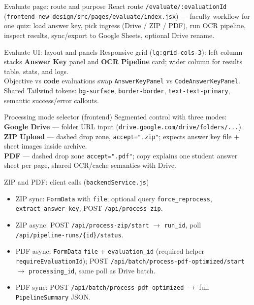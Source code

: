 \documentclass[aspectratio=169]{beamer}
\begin{document}
\begin{frame}{Evaluate page: route and purpose}
  \small
  React route \texttt{/evaluate/:evaluationId} (\texttt{frontend-new-design/src/pages/evaluate/index.jsx}) --- faculty workflow for one quiz: load answer key, pick ingress (Drive / ZIP / PDF), run OCR pipeline, inspect results, sync/export to Google Sheets, optional Drive rename.
\end{frame}

\begin{frame}{Evaluate UI: layout and panels}
  \small
  Responsive grid (\texttt{lg:grid-cols-3}): left column stacks \textbf{Answer Key} panel and \textbf{OCR Pipeline} card; wider column for results table, stats, and logs.\\
  Objective vs \textbf{code} evaluations swap \texttt{AnswerKeyPanel} vs \texttt{CodeAnswerKeyPanel}.\\
  Shared Tailwind tokens: \texttt{bg-surface}, \texttt{border-border}, \texttt{text-text-primary}, semantic success/error callouts.
\end{frame}

\begin{frame}{Processing mode selector (frontend)}
  \small
  Segmented control with three modes:\\
  \textbf{Google Drive} --- folder URL input (\texttt{drive.google.com/drive/folders/...}).\\
  \textbf{ZIP Upload} --- dashed drop zone, \texttt{accept=".zip"}; expects answer key file + sheet images inside archive.\\
  \textbf{PDF} --- dashed drop zone \texttt{accept=".pdf"}; copy explains one student answer sheet per page, shared OCR/cache semantics with Drive.
\end{frame}

\begin{frame}{ZIP and PDF: client calls (\texttt{backendService.js})}
  \tiny
  \begin{itemize}\setlength\itemsep{0.12em}
    \item ZIP sync: \texttt{FormData} with \texttt{file}; optional query \texttt{force\_reprocess}, \texttt{extract\_answer\_key}; POST \texttt{/api/process-zip}.
    \item ZIP async: POST \texttt{/api/process-zip/start} $\rightarrow$ \texttt{run\_id}, poll \texttt{/api/pipeline-runs/\{id\}/status}.
    \item PDF async: \texttt{FormData} \texttt{file} + \texttt{evaluation\_id} (required helper \texttt{requireEvaluationId}); POST \texttt{/api/batch/process-pdf-optimized/start} $\rightarrow$ \texttt{processing\_id}, same poll as Drive batch.
    \item PDF sync: POST \texttt{/api/batch/process-pdf-optimized} $\rightarrow$ full \texttt{PipelineSummary} JSON.
  \end{itemize}
\end{frame}
\end{document}
